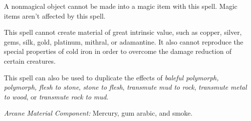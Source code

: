 A nonmagical object cannot be made into a magic item with this spell. Magic items 
aren't affected by this spell.

This spell cannot create material of great intrinsic value, such as copper, silver, 
gems, silk, gold, platinum, mithral, or adamantine. It also cannot reproduce the 
special properties of cold iron in order to overcome the damage reduction of certain 
creatures.

This spell can also be used to duplicate the effects of \textit{baleful polymorph, 
polymorph, flesh to stone}, \textit{stone to flesh}, \textit{transmute mud to rock}, 
\textit{transmute metal to wood}, or \textit{transmute rock to mud}.

\textit{Arcane Material Component:} Mercury, gum arabic, and smoke.

